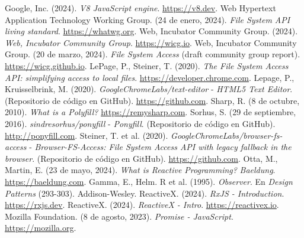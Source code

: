 \begin{thebibliography}{99}
     Google, Inc. (2024). \textit{V8 JavaScript engine}. \href{https://v8.dev}{https://v8.dev}.
     Web Hypertext Application Technology Working Group. (24 de enero, 2024). \textit{File System API living standard}. \href{https://fs.spec.whatwg.org}{https://whatwg.org}.
     Web, Incubator Community Group. (2024). \textit{Web, Incubator Community Group}. \href{https://wicg.io}{https://wicg.io}.
     Web, Incubator Community Group. (20 de marzo, 2024). \textit{File System Access} (draft community group report). \href{https://wicg.github.io/file-system-access/}{https://wicg.github.io}.
     LePage, P., Steiner, T. (2020). \textit{The File System Access API: simplifying access to local files}. \href{https://developer.chrome.com/docs/capabilities/web-apis/file-system-access}{https://developer.chrome.com}.
     Lepage, P., Kruisselbrink, M. (2020). \textit{GoogleChromeLabs/text-editor} - \textit{HTML5 Text Editor}. (Repositorio de código en GitHub). \href{https://github.com/GoogleChromeLabs/text-editor}{https://github.com}.
     Sharp, R. (8 de octubre, 2010). \textit{What is a Polyfill?} \href{https://remysharp.com/2010/10/08/what-is-a-polyfill}{https://remysharp.com}.
     Sorhus, S. (29 de septiembre, 2016). \textit{sindresorhus/ponyfill} - \textit{Ponyfill}. (Repositorio de código en GitHub). \href{http://ponyfill.com}{http://ponyfill.com}.
     Steiner, T. et al. (2020). \textit{GoogleChromeLabs/browser-fs-access} - \textit{Browser-FS-Access: File System Access API with legacy fallback in the browser}. (Repositorio de código en GitHub). \href{https://github.com/GoogleChromeLabs/browser-fs-access}{https://github.com}.
     Otta, M., Martin, E. (23 de mayo, 2024). \textit{What is Reactive Programming?} \textit{Baeldung}. \href{https://www.baeldung.com/cs/reactive-programming}{https://baeldung.com}.
     Gamma, E., Helm. R et al. (1995). \textit{Observer}. En \textit{Design Patterns} (293-303). Addison-Wesley.
     ReactiveX. (2024). \textit{RxJS - Introduction}. \href{https://rxjs.dev/guide/overview}{https://rxjs.dev}.
     ReactiveX. (2024). \textit{ReactiveX - Intro}. \href{https://reactivex.io/intro.html}{https://reactivex.io}.
     Mozilla Foundation. (8 de agosto, 2023). \textit{Promise - JavaScript}. \href{https://developer.mozilla.org/docs/Web/JavaScript/Reference/Global_Objects/Promise}{https://mozilla.org}.

\end{thebibliography}
